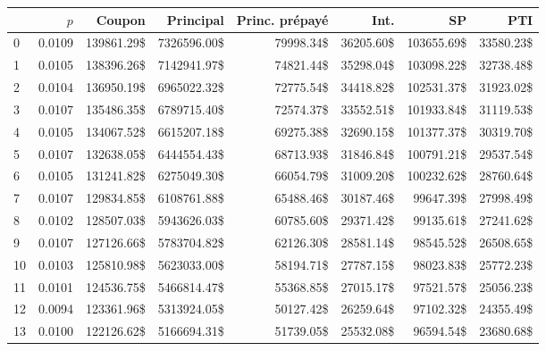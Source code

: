 \begin{tabular}{lrrrrrrr}
\toprule
{} &          $p$ &            Coupon &          Principal &   Princ. prépayé &             Int. &                SP &              PTI \\
\midrule
0  & \num{0.0109} & \num{139861.29}\$ & \num{7326596.00}\$ & \num{79998.34}\$ & \num{36205.60}\$ & \num{103655.69}\$ & \num{33580.23}\$ \\
1  & \num{0.0105} & \num{138396.26}\$ & \num{7142941.97}\$ & \num{74821.44}\$ & \num{35298.04}\$ & \num{103098.22}\$ & \num{32738.48}\$ \\
2  & \num{0.0104} & \num{136950.19}\$ & \num{6965022.32}\$ & \num{72775.54}\$ & \num{34418.82}\$ & \num{102531.37}\$ & \num{31923.02}\$ \\
3  & \num{0.0107} & \num{135486.35}\$ & \num{6789715.40}\$ & \num{72574.37}\$ & \num{33552.51}\$ & \num{101933.84}\$ & \num{31119.53}\$ \\
4  & \num{0.0105} & \num{134067.52}\$ & \num{6615207.18}\$ & \num{69275.38}\$ & \num{32690.15}\$ & \num{101377.37}\$ & \num{30319.70}\$ \\
5  & \num{0.0107} & \num{132638.05}\$ & \num{6444554.43}\$ & \num{68713.93}\$ & \num{31846.84}\$ & \num{100791.21}\$ & \num{29537.54}\$ \\
6  & \num{0.0105} & \num{131241.82}\$ & \num{6275049.30}\$ & \num{66054.79}\$ & \num{31009.20}\$ & \num{100232.62}\$ & \num{28760.64}\$ \\
7  & \num{0.0107} & \num{129834.85}\$ & \num{6108761.88}\$ & \num{65488.46}\$ & \num{30187.46}\$ &  \num{99647.39}\$ & \num{27998.49}\$ \\
8  & \num{0.0102} & \num{128507.03}\$ & \num{5943626.03}\$ & \num{60785.60}\$ & \num{29371.42}\$ &  \num{99135.61}\$ & \num{27241.62}\$ \\
9  & \num{0.0107} & \num{127126.66}\$ & \num{5783704.82}\$ & \num{62126.30}\$ & \num{28581.14}\$ &  \num{98545.52}\$ & \num{26508.65}\$ \\
10 & \num{0.0103} & \num{125810.98}\$ & \num{5623033.00}\$ & \num{58194.71}\$ & \num{27787.15}\$ &  \num{98023.83}\$ & \num{25772.23}\$ \\
11 & \num{0.0101} & \num{124536.75}\$ & \num{5466814.47}\$ & \num{55368.85}\$ & \num{27015.17}\$ &  \num{97521.57}\$ & \num{25056.23}\$ \\
12 & \num{0.0094} & \num{123361.96}\$ & \num{5313924.05}\$ & \num{50127.42}\$ & \num{26259.64}\$ &  \num{97102.32}\$ & \num{24355.49}\$ \\
13 & \num{0.0100} & \num{122126.62}\$ & \num{5166694.31}\$ & \num{51739.05}\$ & \num{25532.08}\$ &  \num{96594.54}\$ & \num{23680.68}\$ \\

\end{tabular}

